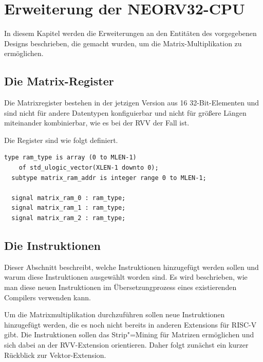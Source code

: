\chapter{Erweiterung der NEORV32-CPU} \label{chpt:Extending_the_NEORV32}

In diesem Kapitel werden die Erweiterungen an den Entitäten des vorgegebenen Designs beschrieben, die gemacht wurden, um die Matrix-Multiplikation zu ermöglichen.




\section{Die Matrix-Register} \label{sec:neorv32-matrix-registers}

Die Matrixregister bestehen in der jetzigen Version aus 16 32-Bit-Elementen und sind nicht für andere Datentypen konfiguierbar und nicht für größere Längen miteinander kombinierbar, wie es bei der \gls{RVV} der Fall ist.

Die Register sind wie folgt definiert.

\begin{lstlisting}[style=VHDLStyle,caption={Die Matrix-Register},captionpos=b]
  type ram_type is array (0 to MLEN-1)
    of std_ulogic_vector(XLEN-1 downto 0);
  subtype matrix_ram_addr is integer range 0 to MLEN-1;

  signal matrix_ram_0 : ram_type;
  signal matrix_ram_1 : ram_type;
  signal matrix_ram_2 : ram_type;
\end{lstlisting}




\section{Die Instruktionen} \label{sec:neorv32-custom-instructions}

Dieser Abschnitt beschreibt, welche Instruktionen hinzugefügt werden sollen und warum diese Instruktionen ausgewählt worden sind. Es wird beschrieben, wie man diese neuen Instruktionen im Übersetzungprozess eines existierenden Compilers verwenden kann.

Um die Matrixmultiplikation durchzuführen sollen neue Instruktionen hinzugefügt werden, die es noch nicht bereits in anderen Extensions für RISC-V gibt. Die Instruktionen sollen das Strip"=Mining für Matrizen ermöglichen und sich dabei an der \gls{RVV}-Extension orientieren. Daher folgt zunächst ein kurzer Rückblick zur Vektor-Extension.

